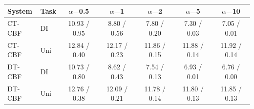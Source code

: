 \begin{tabular}{llccccc}
\hline
System & Task & $\alpha$=0.5 & $\alpha$=1 & $\alpha$=2 & $\alpha$=5 & $\alpha$=10 \\
\hline
CT-CBF & DI & 10.93 / 0.95 & 8.80 / 0.56 & 7.80 / 0.20 & 7.30 / 0.03 & 7.05 / 0.01 \\
CT-CBF & Uni & 12.84 / 0.40 & 12.17 / 0.23 & 11.86 / 0.15 & 11.88 / 0.14 & 11.92 / 0.14 \\
DT-CBF & DI & 10.73 / 0.80 & 8.62 / 0.43 & 7.54 / 0.13 & 6.93 / 0.01 & 6.76 / 0.00 \\
DT-CBF & Uni & 12.76 / 0.38 & 12.09 / 0.21 & 11.78 / 0.14 & 11.80 / 0.13 & 11.85 / 0.13 \\
\hline
\end{tabular}
